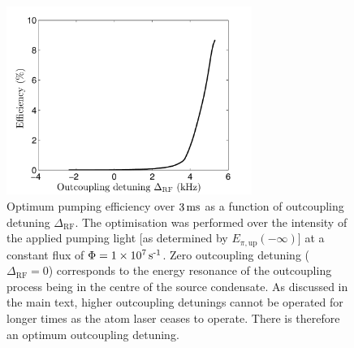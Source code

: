 \begin{figure}
    \centering
    \includegraphics[width=8cm]{3LevelModelEfficiency}
    \caption{Optimum pumping efficiency over $\unit[3]{ms}$ as a function of outcoupling detuning $\Delta_\text{RF}$.  The optimisation was performed over the intensity of the applied pumping light [as determined by $E_{\pi, \text{up}}(-\infty)$] at a constant flux of $\Phi = 1 \times \unit[10^7]{s\textsuperscript{-1}}$.  Zero outcoupling detuning ($\Delta_\text{RF} = 0$) corresponds to the energy resonance of the outcoupling process being in the centre of the source condensate.  As discussed in the main text, higher outcoupling detunings cannot be operated for longer times as the atom laser ceases to operate.  There is therefore an optimum outcoupling detuning.}
    \label{OpticalPumping:3LevelModelEfficiency}
\end{figure}

